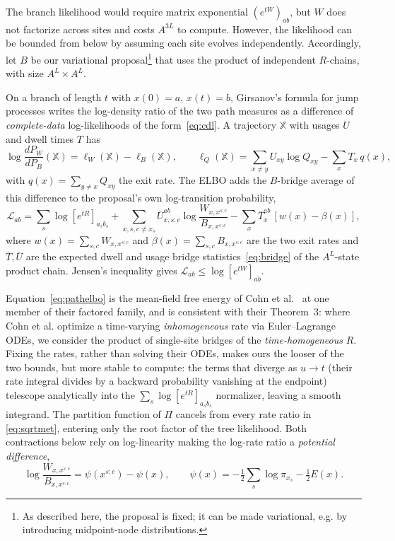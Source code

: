 \documentclass{article}
\begin{document}
The branch likelihood would require matrix exponential $(e^{tW})_{ab}$, but $W$ does not factorize across sites and costs $A^{3L}$ to compute.
However, the likelihood can be bounded from below by assuming each site evolves independently. 
Accordingly, let $B$ be our variational 
proposal\footnote{
As described here, the proposal is fixed; it can be made variational, e.g. by introducing midpoint-node distributions.
} 
that uses the product of independent $R$-chains, with size $A^L \times A^L$. 

On a branch of length $t$ with $x(0)=a$, $x(t)=b$, 
Girsanov's formula for jump processes writes the log-density ratio of the two path
measures as a difference of \emph{complete-data} log-likelihoods of the
form~\eqref{eq:cdl}.
A trajectory $\mathbb X$ with usages $U$ and dwell times $T$ has
\begin{equation}\label{eq:girsanov}
 \log\frac{d P_W}{d P_B}(\mathbb X)=\ell_W(\mathbb X)-\ell_B(\mathbb X),
 \qquad
 \ell_Q(\mathbb X)=\sum_{x\ne y}U_{xy}\log Q_{xy}-\sum_xT_x\,q(x),
\end{equation}
with $q(x)=\sum_{y\ne x}Q_{xy}$ the exit rate. The ELBO adds the $B$-bridge average of this
difference to the proposal's own log-transition probability,
\begin{equation}\label{eq:pathelbo}
 \mathcal L_{ab}=\sum_s\log[e^{tR}]_{a_sb_s}
 +\sum_{x,s,c\ne x_s}\bar U^{ab}_{x,s:c}\log\frac{W_{x,x^{s:c}}}{B_{x,x^{s:c}}}
 -\sum_x\bar T^{ab}_x\,[w(x)-\beta(x)],
\end{equation}
where $w(x)=\sum_{s,c}W_{x,x^{s:c}}$ and $\beta(x)=\sum_{s,c}B_{x,x^{s:c}}$ are the two exit rates
and $\bar T,\bar U$ are the expected dwell and usage bridge statistics~\eqref{eq:bridge} of the
$A^L$-state product chain. Jensen's inequality gives
$\mathcal L_{ab}\le\log[e^{tW}]_{ab}$.

Equation~\eqref{eq:pathelbo} is the mean-field free energy of Cohn et
al.~\cite{cohn2010} at one member of their factored family, and is consistent with their Theorem~3:
where Cohn et al. optimize a time-varying \emph{inhomogeneous} rate via Euler--Lagrange ODEs, we consider the product of single-site
bridges of the \emph{time-homogeneous} $R$. Fixing the rates, rather than
solving their ODEs, makes ours the looser of the two bounds, but more stable to compute: the terms that diverge as $u\to t$
(their rate integral divides by a backward probability vanishing at the endpoint)
telescope analytically into the $\sum_s\log[e^{tR}]_{a_sb_s}$ normalizer, leaving a smooth
integrand. The partition function of
$\Pi$ cancels from every rate ratio in \eqref{eq:sqrtmet}, entering only the root factor
of the tree likelihood. Both contractions below rely on log-linearity making the log-rate
ratio a \emph{potential difference},
\begin{equation}\label{eq:logWB}
 \log\frac{W_{x,x^{s:c}}}{B_{x,x^{s:c}}}=\psi(x^{s:c})-\psi(x),
 \qquad
 \psi(x)=-\tfrac12\sum_s\log\pi_{x_s}-\tfrac12E(x).
\end{equation}
\end{document}
